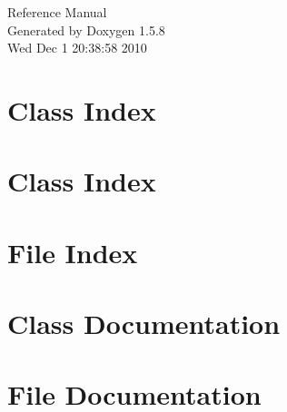 \documentclass[a4paper]{book}
\begin{document}
\begin{titlepage}
\vspace*{7cm}
\begin{center}
{\Large Reference Manual}\\
\vspace*{1cm}
{\large Generated by Doxygen 1.5.8}\\
\vspace*{0.5cm}
{\small Wed Dec 1 20:38:58 2010}\\
\end{center}
\end{titlepage}
\clearemptydoublepage
{}
\tableofcontents
\clearemptydoublepage
{}
\chapter{Class Index}

\chapter{Class Index}

\chapter{File Index}

\chapter{Class Documentation}
































\chapter{File Documentation}





























\printindex
\end{document}
